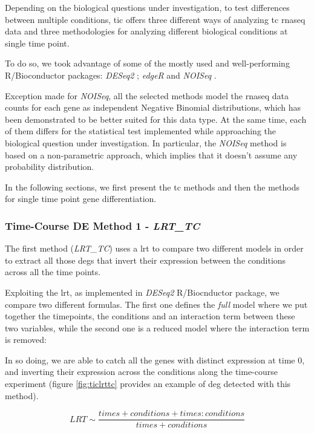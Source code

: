 Depending on the biological questions under investigation, to test differences between multiple conditions, \gls{tic} offers three different ways of analyzing \gls{tc} \gls{rnaseq} data and three methodologies for analyzing different biological conditions at single time point.

To do so, we took advantage of some of the mostly used and well-performing \cite{Costa-Silva2017} R/Bioconductor packages: \textit{DESeq2} \cite{Love2014}; \textit{edgeR} \cite{Robinson2009} and \textit{NOISeq} \cite{Tarazona2011, Tarazona2015}.

Exception made for \textit{NOISeq}, all the selected methods model the \gls{rnaseq} data counts for each gene as independent Negative Binomial distributions, which has been demonstrated \cite{Robinson2007} to be better suited for this data type.
At the same time, each of them differs for the statistical test implemented while approaching the biological question under investigation.
In particular, the \textit{NOISeq} method is based on a non-parametric approach, which implies that it doesn't assume any probability distribution.

In the following sections, we first present the \gls{tc} methods and then the methods for single time point gene differentiation.

\subsubsection{Time-Course DE Method 1 - \textit{LRT\_TC}}
The first method (\textit{LRT\_TC}) uses a \gls{lrt} to compare two different models in order to extract all those \glspl{deg} that invert their expression between the conditions across all the time points.

Exploiting the \gls{lrt}, as implemented in \textit{DESeq2} R/Biocnductor package, we compare two different formulas.
The first one defines the \textit{full} model where we put together the timepoints, the conditions and an interaction term between these two variables, while the second one is a reduced model where the interaction term is removed:

In so doing, we are able to catch all the genes with distinct expression at time 0, and inverting their expression across the conditions along the time-course experiment (figure \ref{fig:ticlrttc} provides an example of \gls{deg} detected with this method). 

\[LRT \sim \frac{times+conditions+times:conditions}{times+conditions}\]

